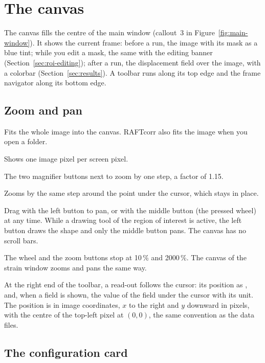\section{The canvas}
\label{sec:canvas}

The canvas fills the centre of the main window (callout~3 in Figure~\ref{fig:main-window}). It
shows the current frame: before a run, the image with its mask as a blue tint; while you edit a
mask, the same with the editing banner (Section~\ref{sec:roi-editing}); after a run, the
displacement field over the image, with a colorbar (Section~\ref{sec:results}). A toolbar runs along its
top edge and the frame navigator along its bottom edge.

\subsection{Zoom and pan}

\begin{description}[leftmargin=1.2cm,style=nextline]
  \item[Fit]
    Fits the whole image into the canvas. RAFTcorr also fits the image when you open a folder.
  \item[100\%]
    Shows one image pixel per screen pixel.
  \item[Zoom in, Zoom out]
    The two magnifier buttons next to  zoom by one step, a factor of 1.15.
  \item[Mouse wheel]
    Zooms by the same step around the point under the cursor, which stays in place.
  \item[Drag]
    Drag with the left button to pan, or with the middle button (the pressed wheel) at any time.
    While a drawing tool of the region of interest is active, the left button draws the shape and
    only the middle button pans. The canvas has no scroll bars.
\end{description}
The wheel and the zoom buttons stop at 10\,\% and 2000\,\%. The canvas of the strain window zooms
and pans the same way.

At the right end of the toolbar, a read-out follows the cursor: its position as
, and, when a field is shown, the value of the field under the cursor
with its unit. The position is in image coordinates, $x$ to the right and $y$ downward in pixels,
with the centre of the top-left pixel at $(0, 0)$, the same convention as the data files.

\subsection{The configuration card}

